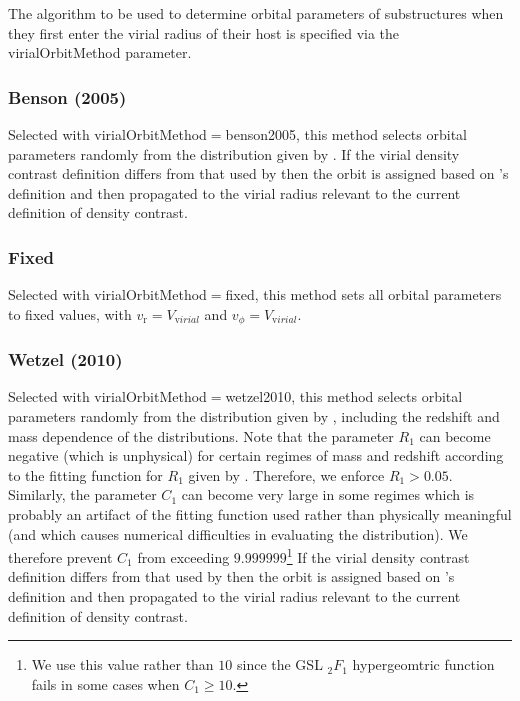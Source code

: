 The algorithm to be used to determine orbital parameters of substructures when they first enter the virial radius of their host is specified via the {\normalfont \ttfamily virialOrbitMethod} parameter.

\subsubsection{Benson (2005)}\label{phys:virialOrbit:virialOrbitBenson2005}

Selected with {\normalfont \ttfamily virialOrbitMethod}$=${\normalfont \ttfamily benson2005}, this method selects orbital parameters randomly from the distribution given by \cite{benson_orbital_2005}. If the virial density contrast definition differs from that used by \cite{benson_orbital_2005} then the orbit is assigned based on \cite{benson_orbital_2005}'s definition and then propagated to the virial radius relevant to the current definition of density contrast.

\subsubsection{Fixed}\label{phys:virialOrbit:virialOrbitFixed}

Selected with {\normalfont \ttfamily virialOrbitMethod}$=${\normalfont \ttfamily fixed}, this method sets all orbital parameters to fixed values, with $v_{\mathrm r}=${\normalfont \ttfamily [virialOrbitsFixedRadialVelocity]}$V_{\mathrm virial}$ and  $v_\phi=${\normalfont \ttfamily [virialOrbitsFixedTangentialVelocity]}$V_{\mathrm virial}$.

\subsubsection{Wetzel (2010)}\label{phys:virialOrbit:virialOrbitWetzel2010}

Selected with {\normalfont \ttfamily virialOrbitMethod}$=${\normalfont \ttfamily wetzel2010}, this method selects orbital parameters randomly from the distribution given by \cite{wetzel_orbits_2010}, including the redshift and mass dependence of the distributions. Note that the parameter $R_1$ can become negative (which is unphysical) for certain regimes of mass and redshift according to the fitting function for $R_1$ given by \cite{wetzel_orbits_2010}. Therefore, we enforce $R_1>0.05$. Similarly, the parameter $C_1$ can become very large in some regimes which is probably an artifact of the fitting function used rather than physically meaningful (and which causes numerical difficulties in evaluating the distribution). We therefore prevent $C_1$ from exceeding $9.999999$\footnote{We use this value rather than $10$ since the GSL $_2F_1$ hypergeomtric function fails in some cases when $C_1\ge 10$.} If the virial density contrast definition differs from that used by \cite{wetzel_orbits_2010} then the orbit is assigned based on \cite{wetzel_orbits_2010}'s definition and then propagated to the virial radius relevant to the current definition of density contrast.

